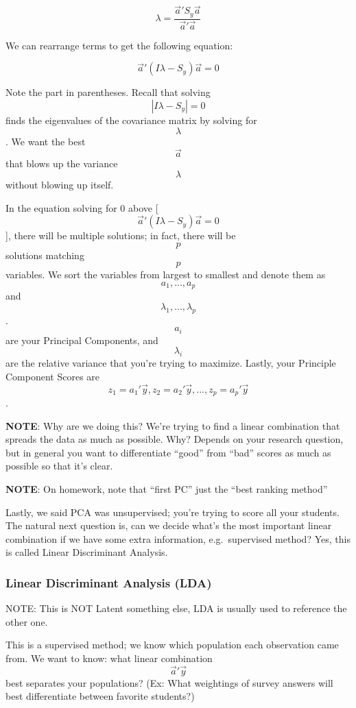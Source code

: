 \documentclass[]{article}
\begin{document}
\[ \lambda = \frac{\vec{a}'S_y\vec{a}}{\vec{a}'\vec{a}} \]

We can rearrange terms to get the following equation:

\[\vec{a}'(I\lambda - S_y)\vec{a} = 0\]

Note the part in parentheses. Recall that solving
\[| I\lambda - S_y | = 0\] finds the eigenvalues of the covariance
matrix by solving for \[\lambda\]. We want the best \[\vec{a}\] that
blows up the variance \[\lambda\] without blowing up itself.

In the equation solving for 0 above
{[}\[\vec{a}'(I\lambda - S_y)\vec{a} = 0\]{]}, there will be multiple
solutions; in fact, there will be \[p\] solutions matching \[p\]
variables. We sort the variables from largest to smallest and denote
them as \[a_1, ..., a_p\] and \[\lambda_1, ..., \lambda_p\]. \[a_i\] are
your Principal Components, and \[\lambda_i\] are the relative variance
that you're trying to maximize. Lastly, your Principle Component Scores
are \[z_1 = a_1'\vec{y}, z_2 = a_2'\vec{y}, ..., z_p = a_p'\vec{y}\].

\textbf{NOTE}: Why are we doing this? We're trying to find a linear
combination that spreads the data as much as possible. Why? Depends on
your research question, but in general you want to differentiate
``good'' from ``bad'' scores as much as possible so that it's clear.

\textbf{NOTE}: On homework, note that ``first PC'' just the ``best
ranking method''

Lastly, we said PCA was unsupervised; you're trying to score all your
students. The natural next question is, can we decide what's the most
important linear combination if we have some extra information,
e.g.~supervised method? Yes, this is called Linear Discriminant
Analysis.

\hypertarget{linear-discriminant-analysis-lda}{%
\subsubsection{Linear Discriminant Analysis
(LDA)}\label{linear-discriminant-analysis-lda}}

NOTE: This is NOT Latent something else, LDA is usually used to
reference the other one.

This is a supervised method; we know which population each observation
came from. We want to know: what linear combination \[\vec{a}'\vec{y}\]
best separates your populations? (Ex: What weightings of survey answers
will best differentiate between favorite students?)
\end{document}
